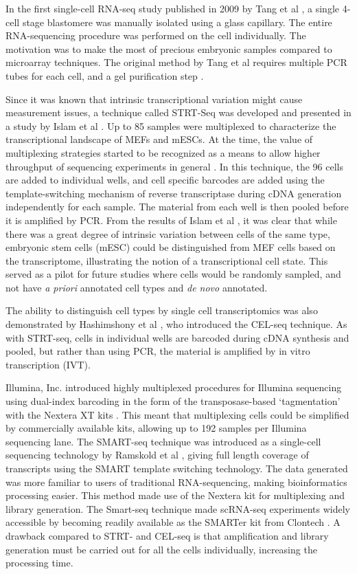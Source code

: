 In the first single-cell RNA-seq study published in 2009 by Tang et al \cite{Tang2009-af}, a single 4-cell stage blastomere was manually isolated using a glass capillary. The entire RNA-sequencing procedure was performed on the cell individually. The motivation was to make the most of precious embryonic samples compared to microarray techniques. The original method by Tang et al requires multiple PCR tubes for each cell, and a gel purification step \cite{Sasagawa2013-ps, Tang2010-am}.

Since it was known that intrinsic transcriptional variation might cause measurement issues, a technique called STRT-Seq was developed and presented in a study by Islam et al \cite{Islam2011-yy}. Up to 85 samples were multiplexed to characterize the transcriptional landscape of MEFs and mESCs. At the time, the value of multiplexing strategies started to be recognized as a means to allow higher throughput of sequencing experiments in general \cite{Kozarewa2011-we}. In this technique, the 96 cells are added to individual wells, and cell specific barcodes are added using the template-switching mechanism of reverse transcriptase during cDNA generation independently for each sample. The material from each well is then pooled before it is amplified by PCR. From the results of Islam et al \cite{Islam2011-yy}, it was clear that while there was a great degree of intrinsic variation between cells of the same type, embryonic stem cells (mESC) could be distinguished from MEF cells based on the transcriptome, illustrating the notion of a transcriptional cell state. This served as a pilot for future studies where cells would be randomly sampled, and not have \textit{a priori} annotated cell types and \textit{de novo} annotated.

The ability to distinguish cell types by single cell transcriptomics was also demonstrated by Hashimshony et al \cite{Hashimshony2012-am}, who introduced the CEL-seq technique. As with STRT-seq, cells in individual wells are barcoded during cDNA synthesis and pooled, but rather than using PCR, the material is amplified by in vitro transcription (IVT).

Illumina, Inc. introduced highly multiplexed procedures for Illumina sequencing using dual-index barcoding in the form of the transposase-based ‘tagmentation’ with the Nextera XT kits \cite{Illumina_Inc2012-mf}. This meant that multiplexing cells could be simplified by commercially available kits, allowing up to 192 samples per Illumina sequencing lane. The SMART-seq technique was introduced as a single-cell sequencing technology by Ramskold et al \cite{Ramskold2012-zc}, giving full length coverage of transcripts using the SMART template switching technology. The data generated was more familiar to users of traditional RNA-sequencing, making bioinformatics processing easier. This method made use of the Nextera kit for multiplexing and library generation. The Smart-seq technique made scRNA-seq experiments widely accessible by becoming readily available as the SMARTer kit from Clontech \cite{Clontech_Laboratories_Inc2013-zf}. A drawback compared to STRT- and CEL-seq is that amplification and library generation must be carried out for all the cells individually, increasing the processing time.

